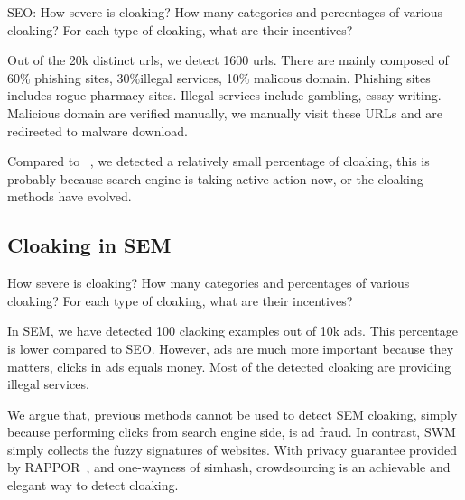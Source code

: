 SEO: How severe is cloaking? How many categories and percentages of various
cloaking? For each type of cloaking, what are their incentives?

Out of the 20k distinct urls, we detect 1600 urls. There are mainly composed of
60\% phishing sites, 30\%illegal services, 10\% malicous domain. Phishing sites includes rogue
pharmacy sites. Illegal services include gambling, essay writing. Malicious
domain are verified manually, we manually visit these URLs and are redirected to
malware download.

Compared to  ~\cite{wang2011cloak}, we detected a relatively small percentage of
cloaking, this is probably because search engine is taking active action now, or
the cloaking methods have evolved.

%
%
%






\subsection{Cloaking in SEM}

How severe is cloaking? How many categories and percentages of various cloaking?
For each type of cloaking, what are their incentives?

In SEM, we have detected 100 claoking examples out of 10k ads. This percentage
is lower compared to SEO. However, ads are much more important because they
matters, clicks in ads equals money. Most of the detected cloaking are providing
illegal services.

We argue that, previous methods cannot be used to detect SEM cloaking, simply
because performing clicks from search engine side, is ad fraud. In contrast,
SWM simply collects the fuzzy signatures of websites. With privacy guarantee
provided by RAPPOR~\cite{erlingsson2014rappor}, and one-wayness of simhash,
crowdsourcing is an achievable and elegant way to detect cloaking.

